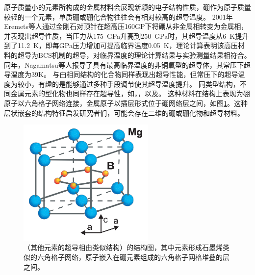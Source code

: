 原子质量小的元素所构成的金属材料会展现新颖的电子结构性质，硼作为原子质量较轻的一个元素，单质硼或硼化合物往往会有相对较高的超导温度。
2001年Eremets等人\cite{eremets2001superconductivity}通过金刚石对顶针在超高压160GP下将硼从非金属相转变为金属相，并表现出超导性质，当压力从\SI{175}{\GPa}升高到\SI{250}{\GPa}时，其超导温度从\SI{6}{\kelvin}提升到了\SI{11.2}{\kelvin}，即每\si{\GPa}压力增加可提高临界温度\SI{0.05}{\kelvin}，理论计算表明该高压材料的超导为BCS机制的超导，对临界温度的理论计算结果与实验测量结果相符合。
同年，Nagamatsu等人\cite{nagamatsu2001superconductivity}报导了具有最高临界温度的非铜氧型的超导体\cite{buzea2001review}，其常压下超导温度为39K。
与由相同结构的化合物同样表现出超导性能，但常压下的超导温度为较小，有趣的是能够通过多种手段调节使其超导温度提升。
同类型结构，不同金属元素的型化物也同样存在超导性，如，\cite{barbero2017doping}，\cite{mudgel2008superconductivity}以及\cite{singh2001superconductivity}。
这种材料在结构上表现为硼原子以六角格子网络连接，金属原子以插层形式位于硼网络层之间，如图\ref{fig:ch1_mgb2}。这种层状嵌套的结构特征启发研究者们，可能会存在二维的硼或硼化物和超导材料。

\begin{figure}[bt]
  \includegraphics[width=0.60\textwidth]{figs/ch1_mgb2.png}
  \centering
  \caption{（其他元素的超导相由类似结构）的结构图，其中元素形成石墨烯类似的六角格子网络，原子嵌入在硼元素组成的六角格子网格堆叠的层之间。}
  \label{fig:ch1_mgb2}
\end{figure}

